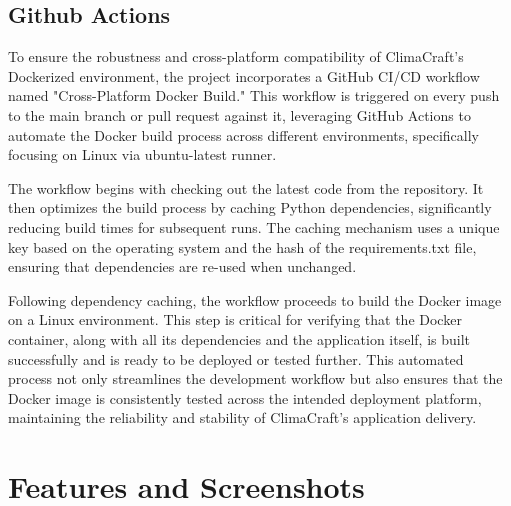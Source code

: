 \documentclass[sn-mathphys-num]{sn-jnl}%
\begin{document}
\subsection{Github Actions}\label{sec3.6}
To ensure the robustness and cross-platform compatibility of ClimaCraft's Dockerized environment, the project incorporates a GitHub CI/CD workflow named "Cross-Platform Docker Build." This workflow is triggered on every push to the main branch or pull request against it, leveraging GitHub Actions to automate the Docker build process across different environments, specifically focusing on Linux via ubuntu-latest runner.

The workflow begins with checking out the latest code from the repository. It then optimizes the build process by caching Python dependencies, significantly reducing build times for subsequent runs. The caching mechanism uses a unique key based on the operating system and the hash of the requirements.txt file, ensuring that dependencies are re-used when unchanged.

Following dependency caching, the workflow proceeds to build the Docker image on a Linux environment. This step is critical for verifying that the Docker container, along with all its dependencies and the application itself, is built successfully and is ready to be deployed or tested further. This automated process not only streamlines the development workflow but also ensures that the Docker image is consistently tested across the intended deployment platform, maintaining the reliability and stability of ClimaCraft's application delivery.

\section{Features and Screenshots}\label{sec4}
\end{document}
